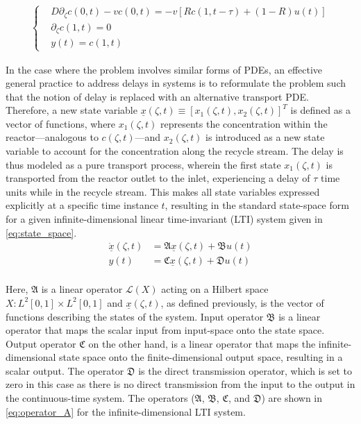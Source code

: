 \begin{align} \label{eq:BC}
    \begin{cases}
        &D \partial_\zeta c(0, t) - v c(0, t) = -v \left[ R c(1, t-\tau) + (1-R) u(t) \right] \\
        &\partial_\zeta c(1, t) = 0 \\
        &y(t) = c(1, t)
    \end{cases}
\end{align}

In the case where the problem involves similar forms of PDEs, an effective general practice to address delays in systems is to reformulate the problem such that the notion of delay is replaced with an alternative transport PDE. Therefore, a new state variable $\underline{x}(\zeta, t) \equiv [x_1(\zeta, t), x_2(\zeta, t)]^T$ is defined as a vector of functions, where $x_1(\zeta, t)$ represents the concentration within the reactor—analogous to $c(\zeta,t)$—and $x_2(\zeta, t)$ is introduced as a new state variable to account for the concentration along the recycle stream. The delay is thus modeled as a pure transport process, wherein the first state $x_1(\zeta, t)$ is transported from the reactor outlet to the inlet, experiencing a delay of $\tau$ time units while in the recycle stream. This makes all state variables expressed explicitly at a specific time instance $t$, resulting in the standard state-space form for a given infinite-dimensional linear time-invariant (LTI) system given in \eqref{eq:state_space}.
\begin{equation} \label{eq:state_space}
    \begin{aligned}
        \dot{\underline{x}}(\zeta, t) &= \mathfrak{A} \underline{x}(\zeta, t) + \mathfrak{B} u(t) \\
        y(t) &= \mathfrak{C} \underline{x}(\zeta, t) + \mathfrak{D} u(t) \\
    \end{aligned}
\end{equation}

Here, $\mathfrak{A}$ is a linear operator $\mathcal{L}(X)$ acting on a Hilbert space $X: L^2[0,1] \times L^2[0,1]$ and $\underline{x}(\zeta,t)$, as defined previously, is the vector of functions describing the states of the system. Input operator $\mathfrak{B}$ is a linear operator that maps the scalar input from input-space onto the state space. Output operator $\mathfrak{C}$ on the other hand, is a linear operator that maps the infinite-dimensional state space onto the finite-dimensional output space, resulting in a scalar output. The operator $\mathfrak{D}$ is the direct transmission operator, which is set to zero in this case as there is no direct transmission from the input to the output in the continuous-time system. The operators ($\mathfrak{A}$, $\mathfrak{B}$, $\mathfrak{C}$, and $\mathfrak{D}$) are shown in \eqref{eq:operator_A} for the infinite-dimensional LTI system.

